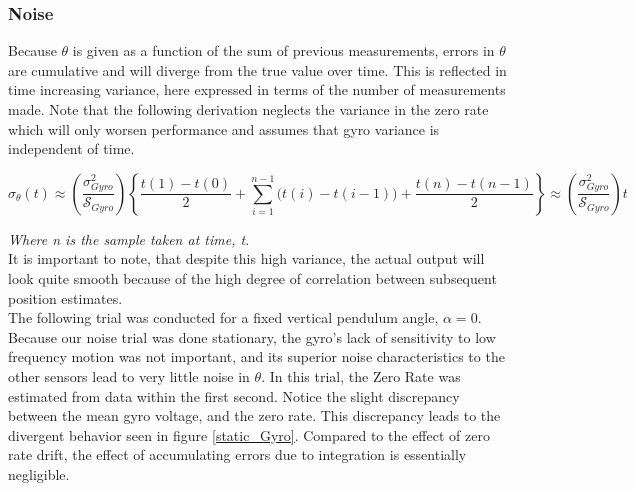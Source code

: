 \documentclass{article}
\theoremstyle{plain}
\theoremstyle{definition}
\theoremstyle{remark}
\newcommand{\Sens}{\mathcal{S}}
\begin{document}
\subsubsection{Noise}

Because $\theta$ is given as a function of the sum of previous measurements, errors in $\theta$ are cumulative and will diverge from the true value over time.  This is reflected in time increasing variance, here expressed in terms of the number of measurements made.  Note that the following derivation neglects the variance in the zero rate which will only worsen performance and assumes that gyro variance is independent of time.

$$ \sigma_{\theta}(t) \approx \left( \frac{\sigma_{Gyro}^2}{\Sens_{Gyro}} \right) \left\{ \frac{t(1) - t(0)}{2} + \sum_{i = 1}^{n-1} \big( t(i) - t(i-1) \big) + \frac{t(n) - t(n-1)}{2} \right\} \approx \left( \frac{\sigma_{Gyro}^2}{\Sens_{Gyro}} \right) t$$

\emph{Where n is the sample taken at time, t.} \\

It is important to note, that despite this high variance, the actual output will look quite smooth because of the high degree of correlation between subsequent position estimates.  \\

The following trial was conducted for a fixed vertical pendulum angle, $\alpha = 0$.  Because our noise trial was done stationary, the gyro's lack of sensitivity to low frequency motion was not important, and its superior noise characteristics to the other sensors lead to very little noise in $\theta$.  In this trial, the Zero Rate was estimated from data within the first second.  Notice the slight discrepancy between the mean gyro voltage, and the zero rate.  This discrepancy leads to the divergent behavior seen in figure \ref{static_Gyro}.   Compared to the effect of zero rate drift, the effect of accumulating errors due to integration is essentially negligible.  
\end{document}
